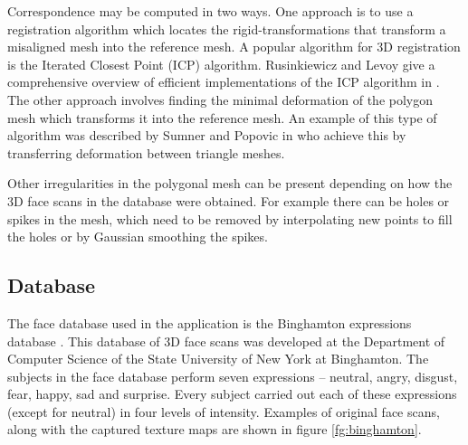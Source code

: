 \documentclass[11pt,a4paper,twoside]{report}
\begin{document}
Correspondence may be computed in two ways. One approach is to use a
registration algorithm which locates the rigid-transformations that transform a misaligned mesh into the reference mesh. A popular algorithm
for 3D registration is the Iterated Closest Point (ICP) algorithm. Rusinkiewicz
and Levoy give a comprehensive overview of efficient implementations of the ICP
algorithm in \cite{ICP}. The other approach involves finding the minimal deformation of
the polygon mesh which transforms it into the reference mesh. An example of this
type of algorithm was described by Sumner and Popovic in \cite{deformTri}
who achieve this by transferring deformation between triangle meshes.

Other irregularities in the polygonal mesh can be present depending on how the
3D face scans in the database were obtained. For example there can be holes or spikes in the
mesh, which need to be removed by interpolating new points to fill the holes or
by Gaussian smoothing the spikes. 

\subsection{Database}
The face database used in the application is the Binghamton expressions database \cite{binghamton}. This database of 3D face scans was developed at the Department of
Computer Science of the State University of New York at Binghamton. The subjects 
in the face database perform seven expressions -- neutral, angry,
disgust, fear, happy, sad and surprise. Every subject carried out each of these
expressions (except for neutral) in four levels of intensity. Examples of original face scans, along with the captured texture maps are
shown in figure \ref{fg:binghamton}.
\end{document}
